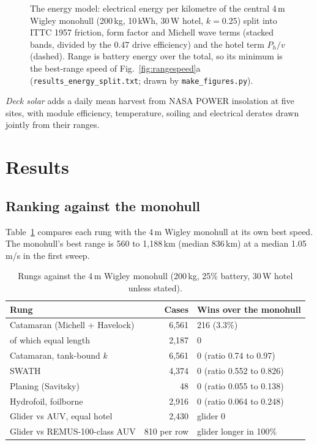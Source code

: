 \documentclass[conference]{IEEEtran}
\begin{document}
\begin{figure}[t]
\centering
\resizebox{\columnwidth}{!}{}
\caption{The energy model: electrical energy per kilometre of the central 4\,m Wigley monohull
(200\,kg, 10\,kWh, 30\,W hotel, $k=0.25$) split into ITTC 1957 friction, form factor and Michell wave
terms (stacked bands, divided by the 0.47 drive efficiency) and the hotel term $P_h/v$ (dashed). Range
is battery energy over the total, so its minimum is the best-range speed of Fig.~\ref{fig:rangespeed}a
(\texttt{results\_energy\_split.txt}; drawn by \texttt{make\_figures.py}).}
\label{fig:energy}
\end{figure}
\emph{Deck solar} adds a daily mean harvest from NASA POWER insolation at five sites, with module
efficiency, temperature, soiling and electrical derates drawn jointly from their ranges.

\section{Results}
\subsection{Ranking against the monohull}\label{sec:rank}
Table~\ref{tab:rank} compares each rung with the 4\,m Wigley monohull at its own best speed.
The monohull's best range is 560 to 1{,}188\,km (median 836\,km) at a median 1.05\,m/s in the
first sweep.

\begin{table}[t]
\caption{Rungs against the 4\,m Wigley monohull (200\,kg, 25\% battery, 30\,W hotel unless stated).}
\label{tab:rank}
\centering\footnotesize
\setlength{\tabcolsep}{4pt}
\begin{tabular}{@{}lrl@{}}
\toprule
Rung & Cases & Wins over the monohull \\
\midrule
Catamaran (Michell + Havelock) & 6{,}561 & 216 (3.3\%) \\
\quad of which equal length & 2{,}187 & 0 \\
Catamaran, tank-bound $k$ & 6{,}561 & 0 (ratio 0.74 to 0.97) \\
SWATH & 4{,}374 & 0 (ratio 0.552 to 0.826) \\
Planing (Savitsky) & 48 & 0 (ratio 0.055 to 0.138) \\
Hydrofoil, foilborne & 2{,}916 & 0 (ratio 0.064 to 0.248) \\
\midrule
Glider vs AUV, equal hotel & 2{,}430 & glider 0 \\
Glider vs REMUS-100-class AUV & 810 per row & glider longer in 100\% \\
\bottomrule
\end{tabular}
\end{table}
\end{document}
